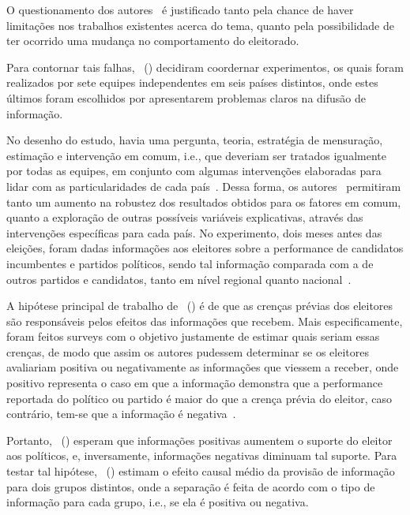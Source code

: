\documentclass[
	12pt,				%
	openright,			%
	twoside,			%
	a4paper,			%
	openany,
	english,			%
	brazil				%
	]{abntex2}
\begin{document}
O questionamento dos autores~\cite{dunning2019voter} é justificado tanto pela chance de haver limitações nos trabalhos existentes acerca do tema, quanto pela possibilidade de ter ocorrido uma mudança no comportamento do eleitorado.

Para contornar tais falhas, ~(\citeyear{dunning2019voter}) decidiram coordernar experimentos, os quais foram realizados por sete equipes independentes em seis países distintos, onde estes últimos foram escolhidos por apresentarem problemas claros na difusão de informação.

No desenho do estudo, havia uma pergunta, teoria, estratégia de mensuração, estimação e intervenção em comum, i.e., que deveriam ser tratados igualmente por todas as equipes, em conjunto com algumas intervenções elaboradas para lidar com as particularidades de cada país~\cite{dunning2019voter}. Dessa forma, os autores~\cite{dunning2019voter} permitiram tanto um aumento na robustez dos resultados obtidos para os fatores em comum, quanto a exploração de outras possíveis variáveis explicativas, através das intervenções específicas para cada país. No experimento, dois meses antes das eleições, foram dadas informações aos eleitores sobre a performance de candidatos incumbentes e partidos políticos, sendo tal informação comparada com a de outros partidos e candidatos, tanto em nível regional quanto nacional~\cite{dunning2019voter}. 

A hipótese principal de trabalho de ~(\citeyear{dunning2019voter}) é de que as crenças prévias dos eleitores são responsáveis pelos efeitos das informações que recebem. Mais especificamente, foram feitos surveys com o objetivo justamente de estimar quais seriam essas crenças, de modo que assim os autores pudessem determinar se os eleitores avaliariam positiva ou negativamente as informações que viessem a receber, onde positivo representa o caso em que a informação demonstra que a performance reportada do político ou partido é maior do que a crença prévia do eleitor, caso contrário, tem-se que a informação é negativa~\cite{dunning2019voter}.

Portanto, ~(\citeyear{dunning2019voter}) esperam que informações positivas aumentem o suporte do eleitor aos políticos, e, inversamente, informações negativas diminuam tal suporte. Para testar tal hipótese, ~(\citeyear{dunning2019voter}) estimam o efeito causal médio da provisão de informação para dois grupos distintos, onde a separação é feita de acordo com o tipo de informação para cada grupo, i.e., se ela é positiva ou negativa.
\end{document}

